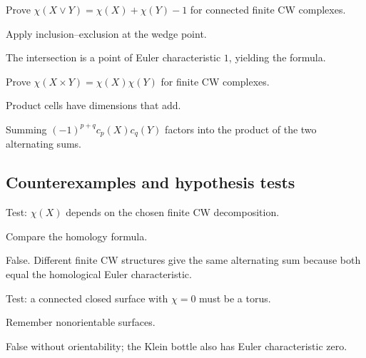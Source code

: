 \begin{exercise}\label{exr:viii21-ped-08}
Prove $\chi(X\vee Y)=\chi(X)+\chi(Y)-1$ for connected finite CW complexes.
\end{exercise}
\begin{hint}
Apply inclusion--exclusion at the wedge point.
\end{hint}
\begin{solution}
The intersection is a point of Euler characteristic $1$, yielding the formula.
\end{solution}

\begin{exercise}\label{exr:viii21-ped-09}
Prove $\chi(X\times Y)=\chi(X)\chi(Y)$ for finite CW complexes.
\end{exercise}
\begin{hint}
Product cells have dimensions that add.
\end{hint}
\begin{solution}
Summing $(-1)^{p+q}c_p(X)c_q(Y)$ factors into the product of the two alternating sums.
\end{solution}

\subsection*{Counterexamples and hypothesis tests}

\begin{exercise}\label{exr:viii21-ped-10}
Test: $\chi(X)$ depends on the chosen finite CW decomposition.
\end{exercise}
\begin{hint}
Compare the homology formula.
\end{hint}
\begin{solution}
False. Different finite CW structures give the same alternating sum because both equal the homological Euler characteristic.
\end{solution}

\begin{exercise}\label{exr:viii21-ped-11}
Test: a connected closed surface with $\chi=0$ must be a torus.
\end{exercise}
\begin{hint}
Remember nonorientable surfaces.
\end{hint}
\begin{solution}
False without orientability; the Klein bottle also has Euler characteristic zero.
\end{solution}

